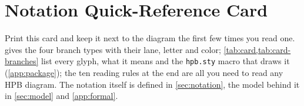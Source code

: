 \section{Notation Quick-Reference Card}
\label{app:card}

Print this card and keep it next to the diagram the first few times you
read one.  gives the four branch types with their
lane, letter and color; \cref{tab:card,tab:card-branches} list every
glyph, what it means and the \texttt{hpb.sty} macro that draws it
(\cref{app:package}); the ten reading rules at the end are all you need to
read any HPB diagram. The notation itself is defined in
\cref{sec:notation}, the model behind it in \cref{sec:model} and
\cref{app:formal}.

\providecommand{\HPBmac}[1]{\texttt{\textbackslash #1}}
\providecommand{\HPBglyph}[2][]{%
  \begin{hpbgraph}[col=0.55cm,lane=0.9cm,legend=1.3cm,#1]#2%
    \path ([yshift=3pt]current bounding box.north)
          ([yshift=-3pt]current bounding box.south);%
  \end{hpbgraph}}

